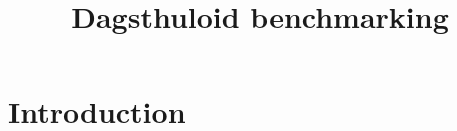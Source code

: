 \documentclass{article}
\begin{document}
\title{Dagsthuloid benchmarking}

\maketitle


\begin{abstract}
\end{abstract}
\tableofcontents

\section{Introduction}

\end{document}
